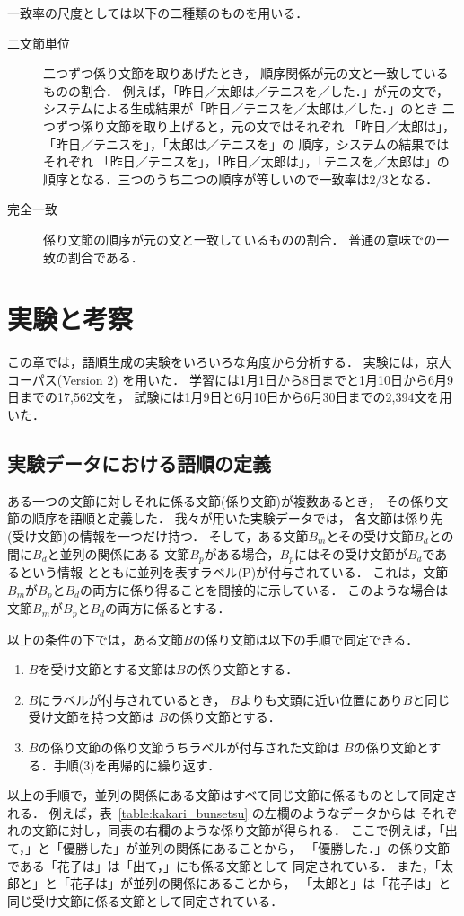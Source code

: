 一致率の尺度としては以下の二種類のものを用いる．
\begin{description}
\item[二文節単位] 
  二つずつ係り文節を取りあげたとき，
  順序関係が元の文と一致しているものの割合．
  例えば，「昨日／太郎は／テニスを／した．」が元の文で，
  システムによる生成結果が「昨日／テニスを／太郎は／した．」のとき
  二つずつ係り文節を取り上げると，元の文ではそれぞれ
  「昨日／太郎は」，「昨日／テニスを」，「太郎は／テニスを」の
  順序，システムの結果ではそれぞれ
  「昨日／テニスを」，「昨日／太郎は」，「テニスを／太郎は」の
  順序となる．三つのうち二つの順序が等しいので一致率は$2/3$となる．  
\item[完全一致] 
  係り文節の順序が元の文と一致しているものの割合．
  普通の意味での一致の割合である．
\end{description}

\section{実験と考察}
\label{sec:exp}

この章では，語順生成の実験をいろいろな角度から分析する．
実験には，京大コーパス(Version 2)
\cite{kurohashi:nlp97} を用いた．
学習には1月1日から8日までと1月10日から6月9日までの17,562文を，
試験には1月9日と6月10日から6月30日までの2,394文を用いた．

\subsection{実験データにおける語順の定義}
\label{sec:exp_data}

ある一つの文節に対しそれに係る文節(係り文節)が複数あるとき，
その係り文節の順序を語順と定義した．
我々が用いた実験データでは，
各文節は係り先(受け文節)の情報を一つだけ持つ．
そして，ある文節$B_{m}$とその受け文節$B_{d}$との間に$B_{d}$と並列の関係にある
文節$B_{p}$がある場合，$B_{p}$にはその受け文節が$B_{d}$であるという情報
とともに並列を表すラベル(P)が付与されている．
これは，文節$B_{m}$が$B_{p}$と$B_{d}$の両方に係り得ることを間接的に示している．
このような場合は文節$B_{m}$が$B_{p}$と$B_{d}$の両方に係るとする．

以上の条件の下では，ある文節$B$の係り文節は以下の手順で同定できる．
\begin{enumerate}
\item $B$を受け文節とする文節は$B$の係り文節とする．
\item $B$にラベルが付与されているとき，
  $B$よりも文頭に近い位置にあり$B$と同じ受け文節を持つ文節は
  $B$の係り文節とする．
\item $B$の係り文節の係り文節うちラベルが付与された文節は
  $B$の係り文節とする．手順(3)を再帰的に繰り返す．
\end{enumerate}
以上の手順で，並列の関係にある文節はすべて同じ文節に係るものとして同定される．
例えば，表~\ref{table:kakari_bunsetsu} の左欄のようなデータからは
それぞれの文節に対し，同表の右欄のような係り文節が得られる．
ここで例えば，「出て，」と「優勝した」が並列の関係にあることから，
「優勝した．」の係り文節である「花子は」は「出て，」にも係る文節として
同定されている．
また，「太郎と」と「花子は」が並列の関係にあることから，
「太郎と」は「花子は」と同じ受け文節に係る文節として同定されている．

